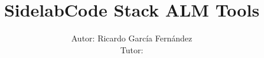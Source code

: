 \documentclass[a4paper, 12pt]{book}
\title{\textbf{SidelabCode Stack ALM Tools}}
\author{Autor: Ricardo Garc\'ia Fern\'andez
\\Tutor: }
\begin{document}
\renewcommand{\refname}{Bibliograf\'ia}  %
\renewcommand{\appendixname}{Apéndice}
\renewcommand{\appendixtocname}{Apéndices}
\renewcommand{\appendixpagename}{Apéndices}





\tableofcontents  %

\newpage

\listoffigures  %

\newpage

\listoftables %

\newpage























\appendix
\clearpage %
\addappheadtotoc
\appendixpage






\begin{comment}
    Referenciar bibliografía: reference 1 ~\cite{New-commercial-OSS-standford-2010}.
\end{comment}
\end{document}
